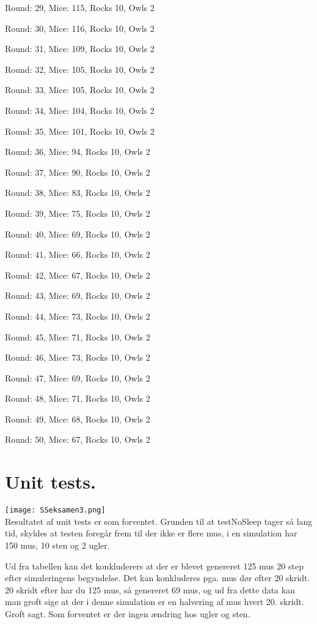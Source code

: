 \documentclass[]{article}
\begin{document}
Round: 29, Mice: 115, Rocks 10, Owls 2

Round: 30, Mice: 116, Rocks 10, Owls 2

Round: 31, Mice: 109, Rocks 10, Owls 2

Round: 32, Mice: 105, Rocks 10, Owls 2

Round: 33, Mice: 105, Rocks 10, Owls 2

Round: 34, Mice: 104, Rocks 10, Owls 2

Round: 35, Mice: 101, Rocks 10, Owls 2

Round: 36, Mice: 94, Rocks 10, Owls 2

Round: 37, Mice: 90, Rocks 10, Owls 2

Round: 38, Mice: 83, Rocks 10, Owls 2

Round: 39, Mice: 75, Rocks 10, Owls 2

Round: 40, Mice: 69, Rocks 10, Owls 2

Round: 41, Mice: 66, Rocks 10, Owls 2

Round: 42, Mice: 67, Rocks 10, Owls 2

Round: 43, Mice: 69, Rocks 10, Owls 2

Round: 44, Mice: 73, Rocks 10, Owls 2

Round: 45, Mice: 71, Rocks 10, Owls 2

Round: 46, Mice: 73, Rocks 10, Owls 2

Round: 47, Mice: 69, Rocks 10, Owls 2

Round: 48, Mice: 71, Rocks 10, Owls 2

Round: 49, Mice: 68, Rocks 10, Owls 2

Round: 50, Mice: 67, Rocks 10, Owls 2


\section{Unit tests. }

\texttt{[image: SSeksamen3.png]}\\

Resultatet af unit tests er som forventet. Grunden til at testNoSleep tager så lang tid, skyldes at testen foregår frem til der ikke er flere mus, i en simulation har 150 mus, 10 sten og 2 ugler.

Ud fra tabellen kan det konkluderers at der er blevet genereret 125 mus 20 step efter simuleringens begyndelse. Det kan konkluderes pga. mus dør efter 20 skridt. 20 skridt efter har du 125 mus, så genereret 69 mus, og ud fra dette data kan man groft sige at der i denne simulation er en halvering af mus hvert 20. skridt. Groft sagt. Som forventet er der ingen ændring hos ugler og sten.
\end{document}
